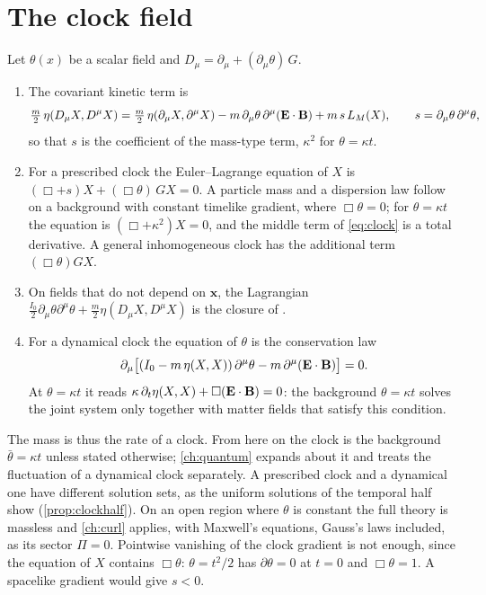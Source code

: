 \section{The clock field}
\label{sec:clock}

\begin{theorem}
\label{thm:clock}
Let $\theta(x)$ be a scalar field and $D_\mu=\partial_\mu+(\partial_\mu\theta)\,G$.
\begin{enumerate}[label=(\roman*),leftmargin=2.2em,itemsep=1pt]
\item The covariant kinetic term is
\begin{equation}
\label{eq:clock}
\tfrac m2\,\eta(D_\mu X,D^\mu X)=\tfrac m2\,\eta(\partial_\mu X,\partial^\mu X)-m\,\partial_\mu\theta\,\partial^\mu(\mathbf E\cdot\mathbf B)
+m\,s\,L_M(X),\qquad s=\partial_\mu\theta\,\partial^\mu\theta ,
\end{equation}
so that $s$ is the coefficient of the mass-type term, $\kappa^2$ for $\theta=\kappa t$.
\item For a prescribed clock the Euler--Lagrange equation of $X$ is $(\Box+s)X+(\Box\theta)\,GX=0$. A particle mass and a dispersion law
follow on a background with constant timelike gradient, where $\Box\theta=0$; for $\theta=\kappa t$ the equation is $(\Box+\kappa^2)X=0$,
and the middle term of \cref{eq:clock} is a total derivative. A general inhomogeneous clock has the additional term $(\Box\theta)GX$.
\item On fields that do not depend on $\mathbf x$, the Lagrangian $\tfrac{I_0}2\partial_\mu\theta\partial^\mu\theta+\tfrac m2\eta(D_\mu X,D^\mu X)$
is the closure of .
\item For a dynamical clock the equation of $\theta$ is the conservation law
\[
\partial_\mu\bigl[(I_0-m\,\eta(X,X))\,\partial^\mu\theta-m\,\partial^\mu(\mathbf E\cdot\mathbf B)\bigr]=0 .
\]
At $\theta=\kappa t$ it reads $\kappa\,\partial_t\eta(X,X)+\Box(\mathbf E\cdot\mathbf B)=0$: the background $\theta=\kappa t$ solves the joint system
only together with matter fields that satisfy this condition.
\end{enumerate}
\end{theorem}

The mass is thus the rate of a clock. From here on the clock is the background $\bar\theta=\kappa t$ unless stated otherwise;
\cref{ch:quantum} expands about it and treats the fluctuation of a dynamical clock separately. A prescribed clock and a dynamical one have
different solution sets, as the uniform solutions of the temporal half show (\cref{prop:clockhalf}). On an open region where $\theta$ is
constant the full theory is massless and \cref{ch:curl} applies, with Maxwell's equations, Gauss's laws included, as its sector $\Pi=0$.
Pointwise vanishing of the clock gradient is not enough, since the equation of $X$ contains $\Box\theta$: $\theta=t^2/2$ has
$\partial\theta=0$ at $t=0$ and $\Box\theta=1$. A spacelike gradient would give $s<0$.

